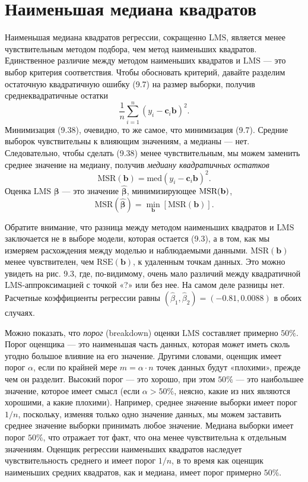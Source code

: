 \section{Наименьшая медиана квадратов}

Наименьшая медиана квадратов регрессии, сокращенно $\text{LMS}$, является менее чувствительным методом подбора, чем метод наименьших квадратов. Единственное различие между методом наименьших квадратов и $\text{LMS}$ --- это выбор критерия соответствия. Чтобы обосновать критерий, давайте разделим остаточную квадратичную ошибку (9.7) на размер выборки, получив среднеквадратичные остатки
\begin{equation}
	\dfrac{1}{n} \sum\limits_{i=1}^{n} (y_i-\textbf{c}_i \textbf{b})^2.
\end{equation}
Минимизация (9.38), очевидно, то же самое, что минимизация (9.7). Средние выборок чувствительны к влияющим значениям, а медианы --- нет. Следовательно, чтобы сделать (9.38) менее чувствительным, мы можем заменить среднее значение на медиану, получив \textit{медиану квадратичных остатков}
\begin{equation}
	\text{MSR}(\textbf{b}) = \text{med}(y_i - \textbf{c}_i \textbf{b})^2.
\end{equation}
Оценка $\text{LMS}$ $\bm{\beta}$ --- это значение $\hat{\bm{\beta}}$, минимизирующее $\text{MSR(\textbf{b})}$,
\begin{equation}
	\text{MSR}(\hat{\bm{\beta}}) = \min_{\textbf{b}} [\text{MSR}(\textbf{b})].
\end{equation}

Обратите внимание, что разница между методом наименьших квадратов и $\text{LMS}$ заключается не в выборе модели, которая остается (9.3), а в том, как мы измеряем расхождения между моделью и наблюдаемыми данными. $\text{MSR}(\textbf{b})$ менее чувствителен, чем $\text{RSE}(\textbf{b})$, к удаленным точкам данных. Это можно увидеть на рис. 9.3, где, по-видимому, очень мало различий между квадратичной $\text{LMS}$-аппроксимацией с точкой «?» или без нее. На самом деле разницы нет. Расчетные коэффициенты регрессии равны $(\hat{\beta}_1, \hat{\beta}_2) = (-0.81, 0.0088)$ в обоих случаях.

Можно показать, что \textit{порог} (breakdown) оценки $\text{LMS}$ составляет примерно $50\%$. Порог оценщика --- это наименьшая часть данных, которая может иметь сколь угодно большое влияние на его значение. Другими словами, оценщик имеет порог $\alpha$, если по крайней мере $m = \alpha \cdot n$ точек данных будут «плохими», прежде чем он разделит. Высокий порог --- это хорошо, при этом $50\%$ --- это наибольшее значение, которое имеет смысл (если $\alpha> 50\%$, неясно, какие из них являются хорошими, а какие плохими). Например, среднее значение выборки имеет порог $1 / n$, поскольку, изменяя только одно значение данных, мы можем заставить среднее значение выборки принимать любое значение. Медиана выборки имеет порог $50\%$, что отражает тот факт, что она менее чувствительна к отдельным значениям. Оценщик регрессии наименьших квадратов наследует чувствительность среднего и имеет порог $1 / n$, в то время как оценщик наименьших средних квадратов, как и медиана, имеет порог примерно $50\%$.

